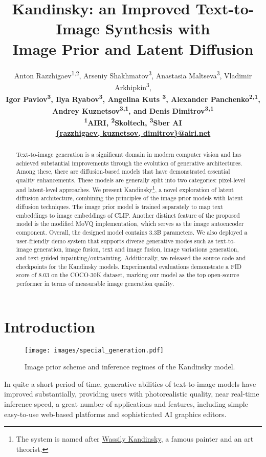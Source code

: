\documentclass[11pt]{article}
\title{Kandinsky: an Improved Text-to-Image Synthesis with \\ Image Prior and Latent Diffusion}
\author{
Anton Razzhigaev\textsuperscript{1,2},  Arseniy Shakhmatov\textsuperscript{3}, Anastasia Maltseva\textsuperscript{3},
Vladimir Arkhipkin\textsuperscript{3}, \\
\bf Igor Pavlov\textsuperscript{3},
Ilya Ryabov\textsuperscript{3}, 
Angelina Kuts \textsuperscript{3}, \bf Alexander Panchenko\textsuperscript{2,1}, \\
\bf Andrey Kuznetsov\textsuperscript{3,1}, and 
Denis Dimitrov\textsuperscript{3,1}\\
\textsuperscript{1}AIRI, 
\textsuperscript{2}Skoltech,
\textsuperscript{3}Sber AI\\
\href{mailto:razzhigaev@airi.net}{\{razzhigaev, kuznetsov, dimitrov\}@airi.net} \\ }
\begin{document}
\maketitle


\begin{abstract}
Text-to-image generation is a significant domain in modern computer vision and has achieved substantial improvements through the evolution of generative architectures. Among these, there are diffusion-based models that have demonstrated essential quality enhancements. These models are generally split into two categories: pixel-level and latent-level approaches. We present Kandinsky\footnote{The system is named after \href{https://en.wikipedia.org/wiki/Wassily_Kandinsky}{Wassily Kandinsky}, a famous painter and an art theorist.}, a novel exploration of latent diffusion architecture, combining the principles of the image prior models with latent diffusion techniques. The image prior model is trained separately to map text embeddings to image embeddings of CLIP. Another distinct feature of the proposed model is the modified MoVQ implementation, which serves as the image autoencoder component. Overall, the designed model contains 3.3B parameters. We also deployed a user-friendly demo system that supports diverse generative modes such as text-to-image generation, image fusion, text and image fusion, image variations generation, and text-guided inpainting/outpainting. Additionally, we released the source code and checkpoints for the Kandinsky models. Experimental evaluations demonstrate a FID score of 8.03 on the COCO-30K dataset, marking our model as the top open-source performer in terms of measurable image generation quality.
\end{abstract}

\section{Introduction}
\renewcommand{\arraystretch}{1.2}

\begin{figure*}
  \centering
  \texttt{[image: images/special\_generation.pdf]}
  \caption{Image prior scheme and inference regimes of the Kandinsky model.}
  \label{fig_architecture_inference_regimes}
\end{figure*}



 In quite a short period of time, generative abilities of text-to-image models have improved substantially, providing users with photorealistic quality, near real-time inference speed, a great number of applications and features, including simple easy-to-use web-based platforms and sophisticated AI graphics editors. 
\end{document}
